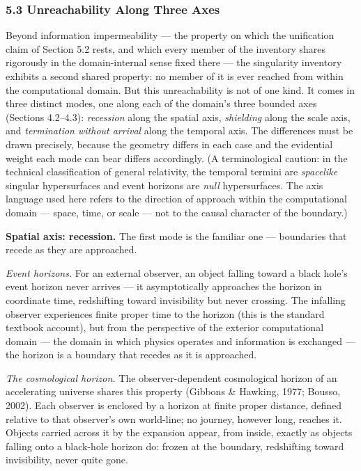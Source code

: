 \documentclass[
]{article}
\begin{document}
\hypertarget{unreachability-along-three-axes}{%
\subsubsection{5.3 Unreachability Along Three
Axes}\label{unreachability-along-three-axes}}

Beyond information impermeability --- the property on which the
unification claim of Section 5.2 rests, and which every member of the
inventory shares rigorously in the domain-internal sense fixed there ---
the singularity inventory exhibits a second shared property: no member
of it is ever reached from within the computational domain. But this
unreachability is not of one kind. It comes in three distinct modes, one
along each of the domain's three bounded axes (Sections 4.2--4.3):
\emph{recession} along the spatial axis, \emph{shielding} along the
scale axis, and \emph{termination without arrival} along the temporal
axis. The differences must be drawn precisely, because the geometry
differs in each case and the evidential weight each mode can bear
differs accordingly. (A terminological caution: in the technical
classification of general relativity, the temporal termini are
\emph{spacelike} singular hypersurfaces and event horizons are
\emph{null} hypersurfaces. The axis language used here refers to the
direction of approach within the computational domain --- space, time,
or scale --- not to the causal character of the boundary.)

\textbf{Spatial axis: recession.} The first mode is the familiar one ---
boundaries that recede as they are approached.

\emph{Event horizons.} For an external observer, an object falling
toward a black hole's event horizon never arrives --- it asymptotically
approaches the horizon in coordinate time, redshifting toward
invisibility but never crossing. The infalling observer experiences
finite proper time to the horizon (this is the standard textbook
account), but from the perspective of the exterior computational domain
--- the domain in which physics operates and information is exchanged
--- the horizon is a boundary that recedes as it is approached.

\emph{The cosmological horizon.} The observer-dependent cosmological
horizon of an accelerating universe shares this property (Gibbons \&
Hawking, 1977; Bousso, 2002). Each observer is enclosed by a horizon at
finite proper distance, defined relative to that observer's own
world-line; no journey, however long, reaches it. Objects carried across
it by the expansion appear, from inside, exactly as objects falling onto
a black-hole horizon do: frozen at the boundary, redshifting toward
invisibility, never quite gone.
\end{document}
